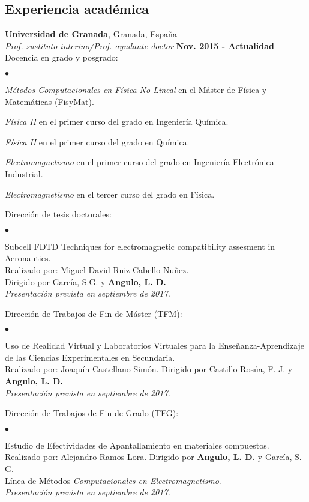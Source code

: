 \documentclass[a4paper,margin,line]{res}
\newenvironment{list2}{
  \begin{list}{$\bullet$}{%
      \setlength{\itemsep}{0in}
      \setlength{\parsep}{0in} \setlength{\parskip}{0in}
      \setlength{\topsep}{0in} \setlength{\partopsep}{0in} 
      \setlength{\leftmargin}{0.2in}}}{\end{list}}
\begin{document}
\begin{resume}
\section{\sc Experiencia académica}
{\bf Universidad de Granada}, Granada, España\\
{\em Prof. sustituto interino/Prof. ayudante doctor} \hfill {\bf Nov. 2015 - Actualidad}\\
Docencia en grado y posgrado:
\begin{list2}
  \item \textit{Métodos Computacionales en Física No Lineal} en el Máster de Física y Matemáticas (FisyMat).
  \item \textit{Física II} en el primer curso del grado en Ingeniería Química.
  \item \textit{Física II} en el primer curso del grado en Química.
  \item \textit{Electromagnetismo} en el primer curso del grado en Ingeniería Electrónica Industrial.
  \item \textit{Electromagnetismo} en el tercer curso del grado en Física.
\end{list2}

Dirección de tesis doctorales:
\begin{list2}
  \item Subcell FDTD Techniques for electromagnetic compatibility assesment in Aeronautics.\\
  Realizado por: Miguel David Ruiz-Cabello Nuñez. \\Dirigido por García, S.G. y \textbf{Angulo, L. D.}\\
  \textit{Presentación prevista en septiembre de 2017.}
\end{list2}

Dirección de Trabajos de Fin de Máster (TFM):
\begin{list2}
  \item Uso de Realidad Virtual y Laboratorios Virtuales para la Enseñanza-Aprendizaje de las Ciencias Experimentales en Secundaria.\\
  Realizado por: Joaquín Castellano Simón. Dirigido por Castillo-Rosúa, F. J. y \textbf{Angulo, L. D.}\\
  \textit{Presentación prevista en septiembre de 2017.}
\end{list2}

Dirección de Trabajos de Fin de Grado (TFG):
\begin{list2}
  \item Estudio de Efectividades de Apantallamiento en materiales compuestos.\\
  Realizado por: Alejandro Ramos Lora. Dirigido por \textbf{Angulo, L. D.} y García, S. G.\\
  Línea de Métodos \textit{Computacionales en Electromagnetismo}.\\
  \textit{Presentación prevista en septiembre de 2017.}
\end{list2}


\end{resume}
\end{document}
